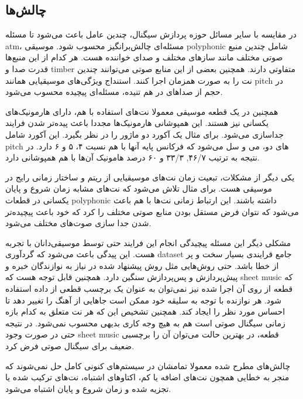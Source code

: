 \subsection{چالش‌ها}
در مقایسه با سایر مسائل حوزه پردازش سیگنال، چندین عامل باعث می‌شود تا مسئله
\gls{atm}، مسئله‌ای چالش‌برانگیز محسوب شود. موسیقی \gls{polyphonic} شامل چندین
منبع صوتی مختلف مانند ساز‌های مختلف و صدای خواننده هست. هر کدام از این منبع‌ها
قدرت صدا و \gls{timber} متفاوتی دارند. همچنین بعضی از این منابع صوتی می‌توانند
چندین نت را به صورت همزمان اجرا کنند. استنداج ویژگی‌های موسیقیایی همانند
\gls{pitch} در حجم از صداهای در هم تنیده، مسئله‌ای پیچیده محسوب می‌شود.

همچنین در یک قطعه موسیقی معمولا نت‌های استفاده با هم، دارای هارمونیک‌های یکسانی
نیز هستند. این همپوشانی هارمونیک‌ها مجددا باعث پیده‌تر شدن فرایند جداسازی
می‌شود. برای مثال یک آکورد دو ماژور را در نظر بگیرد. این آکورد شامل \gls{pitch}
های دو، می و سل می‌شود که فرکانس پایه آنها با هم نسبت ۴، ۵ و ۶ دارد. در نتیجه به
ترتیب ۴۶/۷, ۳۳/۳ و ۶۰ درصد هامونیک آن‌ها با هم همپوشانی دارد.

یکی دیگر از مشکلات، تبعیت زمان نت‌های موسیقیایی از ریتم و ساختار زمانی رایج در
موسیقی هست. برای مثال تلاش می‌شود که نت‌های مشابه زمان شروع و پایان یکسانی در
قطعات \gls{polyphonic} داشته باشند. این ارتباط زمانی نت‌ها با هم باعث می‌شود که
نتوان فرض مستقل بودن منابع صوتی مختلف را کرد که خود باعث پیچیده‌تر شدن جدا سازی
صوت‌های مختلف می‌شود.

مشکلی دیگر این مسئله پیچیدگی انجام این فرایند حتی توسط موسیقی‌دانان با تجربه
هست. این پیدگی باعث می‌شود که گردآوری \gls{dataset} جامع قرایندی بسیار سخت و پر
از خطا باشد. حتی روش‌هایی مثل روش پیشنهاد شده در \cite{su2015escaping} نیاز به
نوازندگان خبره و پیش‌پردازش و پس‌پردازش سنگین دارد. همچنین قابل توجه هست که
\gls{sheet music} که قطعه از روی آن اجرا شده نیز نمی‌توان به عنوان یک برچسب قطعی
از داده استفاده شود. هر نوازنده با توجه به سلیقه خود ممکن است جاهایی از آهنگ را
تغییر دهد تا احساس مورد نظر را ایجاد کند. همچنین تشخیص این که هر نت متعلق به
کدام بازه زمانی سیگنال صوتی است هم به هیچ وجه کاری بدیهی محسوب نمی‌شود. در نتیجه
حتی در صورت وجود \gls{sheet music} قطعه، در بهترین حالت می‌توان آن را برچسبی
ضعیف برای سیگنال صوتی فرض کرد.

چالش‌های مطرح شده معمولا تمامشان در سیستم‌های کنونی کامل حل نمی‌شوند که منجر به
خطایی همچون نت‌های اضافه یا کم، اکتاوهای اشتباه، نت‌های ترکیب شده یا تجزیه شده و
زمان شروع و پایان اشتباه می‌شود.